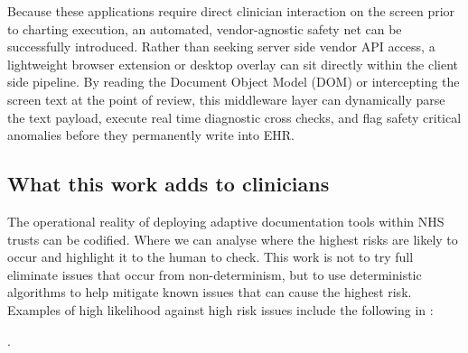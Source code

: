 \documentclass[11pt,a4paper]{article}
\begin{document}
Because these applications require direct clinician interaction on the screen prior to charting execution, an automated, vendor-agnostic safety net can be successfully introduced. Rather than seeking server side vendor API access, a lightweight browser extension or desktop overlay can sit directly within the client side pipeline. By reading the Document Object Model (DOM) or intercepting the screen text at the point of review, this middleware layer can dynamically parse the text payload, execute real time diagnostic cross checks, and flag safety critical anomalies before they permanently write into EHR.

\subsection{What this work adds to clinicians}
\label{sec:What this work adds to clinicians}

The operational reality of deploying adaptive documentation tools within NHS trusts can be codified. Where we can analyse where the highest risks are likely to occur and highlight it to the human to check. This work is not to try full eliminate issues that occur from non-determinism, but to use deterministic algorithms to help mitigate known issues that can cause the highest risk.
Examples of high likelihood against high risk issues include the following in :

.


\small
\renewcommand{\arraystretch}{1.2}
\end{document}
